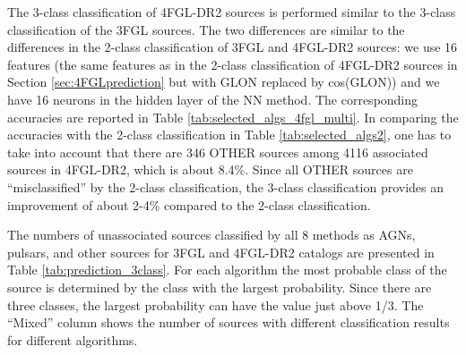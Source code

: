 The 3-class classification of 4FGL-DR2 sources is performed similar to the 3-class classification of the 3FGL sources.
The two differences are similar to the differences in the 2-class classification of 3FGL and 4FGL-DR2 sources:
we use 16 features (the same features as in the 2-class classification of 4FGL-DR2 sources in Section \ref{sec:4FGLprediction} but with GLON replaced by cos(GLON))
and we have 16 neurons in the hidden layer of the NN method.
The corresponding accuracies are reported in Table \ref{tab:selected_algs_4fgl_multi}.
In comparing the accuracies with the 2-class classification in Table \ref{tab:selected_algs2}, 
one has to take into account that there are 346 OTHER sources among 4116 associated sources in 4FGL-DR2, which is about 8.4\%.
Since all OTHER sources are ``misclassified'' by the 2-class classification, the 3-class classification provides an improvement of about 2-4\% compared to the 2-class classification.

The numbers of unassociated sources classified by all 8 methods as AGNs, pulsars, and other sources for 3FGL and 4FGL-DR2 catalogs are presented in Table \ref{tab:prediction_3class}.
For each algorithm the most probable class of the source is determined by the class with the largest probability.
Since there are three classes, the largest probability can have the value just above 1/3.
The ``Mixed'' column shows the number of sources with different classification results for different algorithms.

\begin{table}[!h]
\hspace{-0.2cm}
    \vspace{2mm}
    \caption{Testing accuracy of the four selected algorithms for the 3-class classification of 4FGL-DR2 sources. 
    ``\_O'' denotes training with oversampling.}
    \label{tab:selected_algs_4fgl_multi}
\end{table}